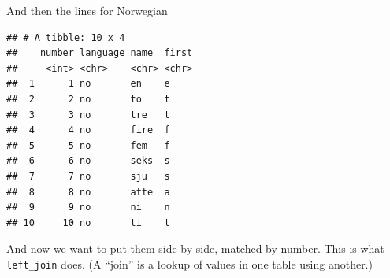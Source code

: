 \documentclass[ignorenonframetext,]{beamer}
\newenvironment{Shaded}{\begin{snugshade}}{\end{snugshade}}
\newcommand{\KeywordTok}[1]{\textcolor[rgb]{0.13,0.29,0.53}{\textbf{#1}}}
\newcommand{\NormalTok}[1]{#1}
\newcommand{\OperatorTok}[1]{\textcolor[rgb]{0.81,0.36,0.00}{\textbf{#1}}}
\newcommand{\StringTok}[1]{\textcolor[rgb]{0.31,0.60,0.02}{#1}}
\begin{document}
\begin{frame}[fragile]{And then the lines for Norwegian}
\protect\hypertarget{and-then-the-lines-for-norwegian}{}

\footnotesize

\begin{Shaded}
\end{Shaded}

\begin{verbatim}
## # A tibble: 10 x 4
##    number language name  first
##     <int> <chr>    <chr> <chr>
##  1      1 no       en    e    
##  2      2 no       to    t    
##  3      3 no       tre   t    
##  4      4 no       fire  f    
##  5      5 no       fem   f    
##  6      6 no       seks  s    
##  7      7 no       sju   s    
##  8      8 no       atte  a    
##  9      9 no       ni    n    
## 10     10 no       ti    t
\end{verbatim}

\normalsize

And now we want to put them side by side, matched by number. This is
what \texttt{left\_join} does. (A ``join'' is a lookup of values in one
table using another.)

\end{frame}
\end{document}
